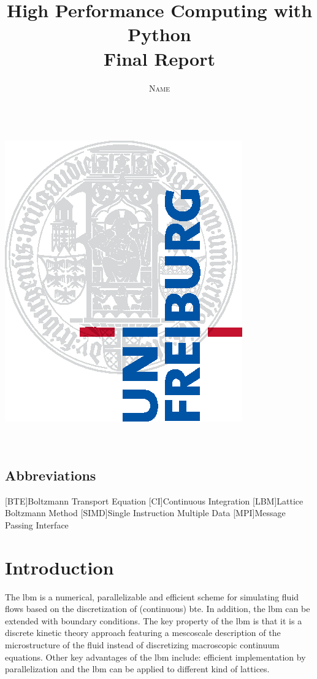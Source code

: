 \documentclass[a4paper,11pt, footsepline]{book}
\title{\Huge \textbf{High Performance Computing with Python} \vspace{4mm} \\ \huge Final Report}
\author{\textsc{Name} \\ \vspace{3mm}\text{matricular number}  \\
\vspace{3mm}\text{mail}}
\begin{document}
\makeatletter
    \begin{titlepage}
        \begin{center}
            \includegraphics[width=0.5\linewidth]{logos/Uni_Logo-Grundversion_E1_A4_CMYK.eps}\\[4ex]
            {\huge \bfseries  \@title }\\[2ex] 
            {\LARGE  \@author}\\[30ex] 
            {\large \@date}
        \end{center}
    \end{titlepage}
\makeatother
\thispagestyle{empty}
\newpage



\tableofcontents

\begin{acronym}
\section*{Abbreviations}
[BTE]{Boltzmann Transport Equation}
[CI]{Continuous Integration}
[LBM]{Lattice Boltzmann Method}
[SIMD]{Single Instruction Multiple Data}
[MPI]{Message Passing Interface}
\end{acronym}
\mainmatter

\chapter{Introduction}
The \acf{lbm} is a numerical, parallelizable and efficient scheme for simulating fluid flows based on the discretization of (continuous) \acf{bte}.\cite{McNamara.1988} In addition, the \ac{lbm} can be extended with boundary conditions. The key property of the \ac{lbm} is that it is a discrete kinetic theory approach featuring a mescoscale description of the microstructure of the fluid instead of discretizing macroscopic continuum equations. Other key advantages of the \ac{lbm} include: efficient implementation by parallelization and the \ac{lbm} can be applied to different kind of lattices.
\end{document}
